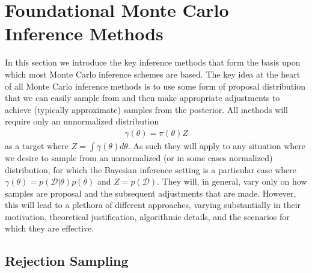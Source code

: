
\section{Foundational Monte Carlo Inference Methods}
\label{sec:inf:foundation}

In this section we introduce the key inference methods that form
the basis upon which most Monte Carlo inference schemes are based.  The
key idea at the heart of all Monte Carlo inference methods is to use some form
of proposal distribution that we can easily sample from and then make
appropriate adjustments to achieve (typically approximate) samples from
the posterior.  All methods will require only an unnormalized distribution
\begin{align}
\label{eq:inf:unnorm-target}
\gamma(\theta) = \pi(\theta)Z
\end{align}
as a target where $Z = \int \gamma(\theta) d\theta$.  As such they will apply to
any situation where we desire to sample from an unnormalized 
(or in some cases normalized) distribution, for which
the Bayesian inference setting is a particular case where
$\gamma(\theta) = p(\mathcal{D}|\theta)p(\theta)$ and $Z = p(\mathcal{D})$.
They will, in general, vary only on how samples are proposal
and the subsequent adjustments that are made.  However, this will lead to a
plethora of different approaches, varying substantially in their motivation,
theoretical justification, algorithmic details, and the scenarios for which they
are effective.

\subsection{Rejection Sampling}
\label{sec:inf:foundation:rejection}

